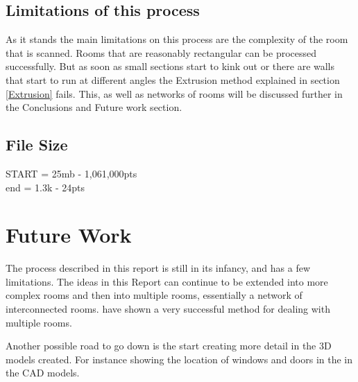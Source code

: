 	\subsection{Limitations of this process}
		As it stands the main limitations on this process are the complexity of the room that is scanned. Rooms that are reasonably rectangular can be processed successfully. But as soon as small sections start to kink out or there are walls that start to run at different angles the Extrusion method explained in section \ref{Extrusion} fails. This, as well as networks of rooms will be discussed further in the Conclusions and Future work section.
		
	\subsection{File Size}
		START = 25mb - 1,061,000pts
		\\
		end  = 1.3k - 24pts
	
\section{Future Work}
	The process described in this report is still in its infancy, and has a few limitations. The ideas in this Report can continue to be extended into more complex rooms and then into multiple rooms, essentially a network of interconnected rooms. \cite{mura_automatic_2014} have shown a very successful method for dealing with multiple rooms.
	
	Another possible road to go down is the start creating more detail in the 3D models created. For instance showing the location of windows and doors in the in the CAD models.
	
